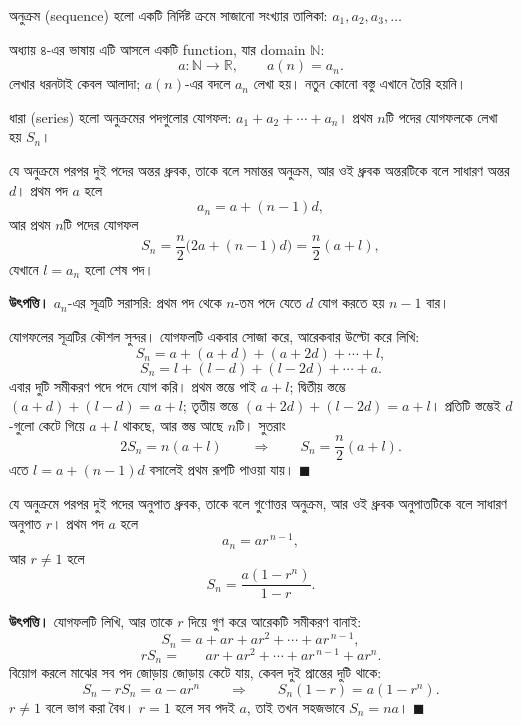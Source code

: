 \documentclass[11pt]{article}
\begin{document}
\begin{idea}[অনুক্রম ও ধারা]
অনুক্রম (sequence) হলো একটি নির্দিষ্ট ক্রমে সাজানো সংখ্যার তালিকা:
$a_1, a_2, a_3, \dots$

অধ্যায় ৪-এর ভাষায় এটি আসলে একটি function, যার domain $\mathbb{N}$:
\[
  a \colon \mathbb{N} \to \mathbb{R} , \qquad a(n) = a_n .
\]
লেখার ধরনটাই কেবল আলাদা; $a(n)$-এর বদলে $a_n$ লেখা হয়। নতুন কোনো বস্তু এখানে
তৈরি হয়নি।

ধারা (series) হলো অনুক্রমের পদগুলোর যোগফল: $a_1 + a_2 + \cdots + a_n$।
প্রথম $n$টি পদের যোগফলকে লেখা হয় $S_n$।
\end{idea}

\begin{idea}[সমান্তর ধারা]
যে অনুক্রমে পরপর দুই পদের অন্তর ধ্রুবক, তাকে বলে সমান্তর অনুক্রম, আর ওই ধ্রুবক
অন্তরটিকে বলে সাধারণ অন্তর $d$। প্রথম পদ $a$ হলে
\[
  a_n = a + (n-1)d ,
\]
আর প্রথম $n$টি পদের যোগফল
\[
  S_n = \frac{n}{2}\Big( 2a + (n-1)d \Big) = \frac{n}{2}(a + l) ,
\]
যেখানে $l = a_n$ হলো শেষ পদ।
\end{idea}

\noindent
\textbf{উৎপত্তি।} $a_n$-এর সূত্রটি সরাসরি: প্রথম পদ থেকে $n$-তম পদে যেতে $d$
যোগ করতে হয় $n-1$ বার।

যোগফলের সূত্রটির কৌশল সুন্দর। যোগফলটি একবার সোজা করে, আরেকবার উল্টো করে লিখি:
\[
  S_n = a + (a+d) + (a+2d) + \cdots + l ,
\]
\[
  S_n = l + (l-d) + (l-2d) + \cdots + a .
\]
এবার দুটি সমীকরণ পদে পদে যোগ করি। প্রথম স্তম্ভে পাই $a + l$; দ্বিতীয় স্তম্ভে
$(a+d) + (l-d) = a + l$; তৃতীয় স্তম্ভে $(a+2d) + (l-2d) = a + l$। প্রতিটি
স্তম্ভেই $d$-গুলো কেটে গিয়ে $a + l$ থাকছে, আর স্তম্ভ আছে $n$টি। সুতরাং
\[
  2 S_n = n(a + l)
  \qquad \Longrightarrow \qquad
  S_n = \frac{n}{2}(a+l) .
\]
এতে $l = a + (n-1)d$ বসালেই প্রথম রূপটি পাওয়া যায়। $\blacksquare$

\begin{idea}[গুণোত্তর ধারা]
যে অনুক্রমে পরপর দুই পদের অনুপাত ধ্রুবক, তাকে বলে গুণোত্তর অনুক্রম, আর ওই
ধ্রুবক অনুপাতটিকে বলে সাধারণ অনুপাত $r$। প্রথম পদ $a$ হলে
\[
  a_n = a r^{\,n-1} ,
\]
আর $r \neq 1$ হলে
\[
  S_n = \frac{a(1 - r^{n})}{1 - r} .
\]
\end{idea}

\noindent
\textbf{উৎপত্তি।} যোগফলটি লিখি, আর তাকে $r$ দিয়ে গুণ করে আরেকটি সমীকরণ বানাই:
\[
  S_n = a + ar + ar^{2} + \cdots + ar^{\,n-1} ,
\]
\[
  r S_n = \phantom{a + {}} ar + ar^{2} + \cdots + ar^{\,n-1} + ar^{n} .
\]
বিয়োগ করলে মাঝের সব পদ জোড়ায় জোড়ায় কেটে যায়, কেবল দুই প্রান্তের দুটি থাকে:
\[
  S_n - r S_n = a - ar^{n}
  \qquad \Longrightarrow \qquad
  S_n (1 - r) = a(1 - r^{n}) .
\]
$r \neq 1$ বলে ভাগ করা বৈধ। $r = 1$ হলে সব পদই $a$, তাই তখন সহজভাবে
$S_n = na$। $\blacksquare$
\end{document}
